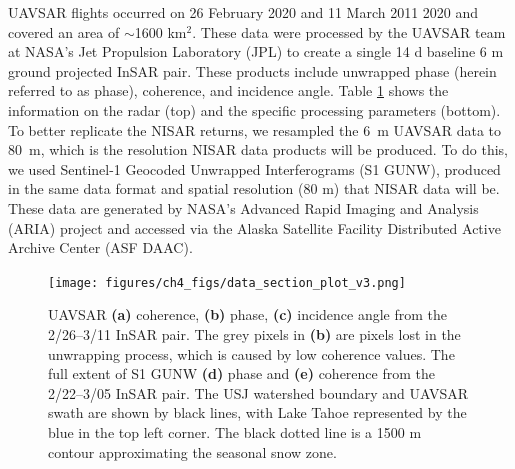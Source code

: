 UAVSAR flights occurred on 26 February 2020 and 11 March 2011 2020 and covered an area of $\sim$1600 km$^{2}$. These data were processed by the UAVSAR team at NASA's Jet Propulsion Laboratory (JPL) to create a single 14 d baseline 6 m ground projected InSAR pair. These products include unwrapped phase (herein referred to as phase), coherence, and incidence angle. Table \ref{table:uavsar_proc} shows the information on the radar (top) and the specific processing parameters (bottom). To better replicate the NISAR returns, we resampled the 6~m UAVSAR data to 80~m, which is the resolution NISAR data products will be produced. To do this, we used Sentinel-1 Geocoded Unwrapped Interferograms (S1 GUNW), produced in the same data format and spatial resolution (80 m) that NISAR data will be. These data are generated by NASA's Advanced Rapid Imaging and Analysis (ARIA) \citep{bekaertDevelopmentDisseminationStandardized2019,buzzangaSustainedMonitoringSubsidence2020} project and accessed via the Alaska Satellite Facility Distributed Active Archive Center (ASF DAAC).


\begin{figure}[ht]
\texttt{[image: figures/ch4\_figs/data\_section\_plot\_v3.png]}
\centering
\caption{UAVSAR \textbf{(a)} coherence, \textbf{(b)} phase, \textbf{(c)} incidence angle from the 2/26--3/11 InSAR pair. The grey pixels in \textbf{(b)} are pixels lost in the unwrapping process, which is caused by low coherence values. The full extent of S1 GUNW \textbf{(d)} phase and \textbf{(e)} coherence from the 2/22--3/05 InSAR pair. The USJ watershed boundary and UAVSAR swath are shown by black lines, with Lake Tahoe represented by the blue in the top left corner. The black dotted line is a 1500 m contour approximating the seasonal snow zone.}
\label{table:uavsar_proc}
\end{figure}
\clearpage

